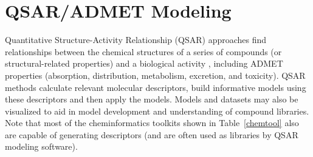 \section{QSAR/ADMET Modeling}
  
Quantitative Structure-Activity Relationship (QSAR) approaches find relationships between the chemical structures of a series of compounds (or structural-related properties) and a biological activity \cite{1995}, including ADMET properties (absorption, distribution, metabolism, excretion, and toxicity).  QSAR methods calculate relevant molecular descriptors, build informative models using these descriptors and then apply the models.  Models and datasets may also be visualized to aid in model development and understanding of compound libraries.  Note that most of the cheminformatics toolkits shown in Table~\ref{chemtool} also are capable of generating descriptors (and are often used as libraries by QSAR modeling software).

